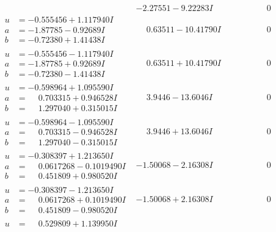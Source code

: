 \documentclass[1p]{elsarticle_modified}
\theoremstyle{definition}
\begin{document}
$$\begin{array}{c|c|c}
 & -2.27551 - 9.22283 I & \phantom{-0.000000 } 0 \\ \hline\begin{aligned}
u &= -0.555456 + 1.117940 I \\
a &= -1.87785 - 0.92689 I \\
b &= -0.72380 + 1.41438 I\end{aligned}
 & \phantom{-}0.63511 - 10.41790 I & \phantom{-0.000000 } 0 \\ \hline\begin{aligned}
u &= -0.555456 - 1.117940 I \\
a &= -1.87785 + 0.92689 I \\
b &= -0.72380 - 1.41438 I\end{aligned}
 & \phantom{-}0.63511 + 10.41790 I & \phantom{-0.000000 } 0 \\ \hline\begin{aligned}
u &= -0.598964 + 1.095590 I \\
a &= \phantom{-}0.703315 + 0.946528 I \\
b &= \phantom{-}1.297040 + 0.315015 I\end{aligned}
 & \phantom{-}3.9446 - 13.6046 I & \phantom{-0.000000 } 0 \\ \hline\begin{aligned}
u &= -0.598964 - 1.095590 I \\
a &= \phantom{-}0.703315 - 0.946528 I \\
b &= \phantom{-}1.297040 - 0.315015 I\end{aligned}
 & \phantom{-}3.9446 + 13.6046 I & \phantom{-0.000000 } 0 \\ \hline\begin{aligned}
u &= -0.308397 + 1.213650 I \\
a &= \phantom{-}0.0617268 - 0.1019490 I \\
b &= \phantom{-}0.451809 + 0.980520 I\end{aligned}
 & -1.50068 - 2.16308 I & \phantom{-0.000000 } 0 \\ \hline\begin{aligned}
u &= -0.308397 - 1.213650 I \\
a &= \phantom{-}0.0617268 + 0.1019490 I \\
b &= \phantom{-}0.451809 - 0.980520 I\end{aligned}
 & -1.50068 + 2.16308 I & \phantom{-0.000000 } 0 \\ \hline\begin{aligned}
u &= \phantom{-}0.529809 + 1.139950 I \\

\end{aligned}
\end{array}$$
\end{document}
